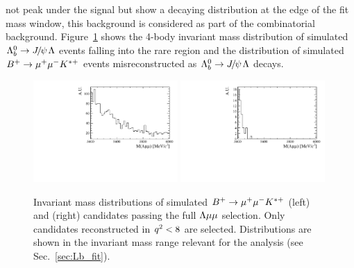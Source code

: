 not peak under the signal but show a decaying distribution at the edge of the fit mass window, this
background is considered as part of the combinatorial background.
Figure~\ref{fig:peakingBkgs} shows the 4-body invariant mass distribution of simulated $\Lb\ra\jpsi\Lz$
events falling into the rare \qsq region and the distribution of simulated $B^{+} \rightarrow{\ensuremath{\mu^+\mu^-}} K^{*+}$
events misreconstructed as $\Lb\ra\jpsi\Lz$ decays.
%
\begin{figure}
\centering
\includegraphics[width=0.49\textwidth]{Lmumu/figs/Bu2Kstplus_mass.pdf}
\includegraphics[width=0.49\textwidth]{Lmumu/figs/JpsiL_leakage_mass.pdf}
\caption{ Invariant mass distributions of simulated $B^{+} \rightarrow{\ensuremath{\mu^+\mu^-}} K^{*+}$ (left)
and \Lb\to\jpsi\Lz (right) candidates passing the full ${\Lambda}\mu\mu$ selection. Only \Lb\to\jpsi\Lz
candidates reconstructed in ${q^2} < 8$ \gevgevcccc are selected.
Distributions are shown in the invariant mass range relevant for the analysis 
(see Sec.~\ref{sec:Lb_fit}). }
\label{fig:peakingBkgs}
\end{figure}

